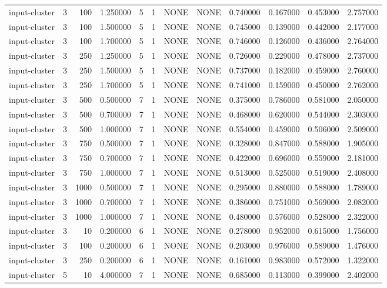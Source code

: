 \begin{tabular}{lrrrllllrrrr}
input-cluster & 3 & 100 & 1.250000 & 5 & 1 & NONE & NONE & 0.740000 & 0.167000 & 0.453000 & 2.757000 \\
input-cluster & 3 & 100 & 1.500000 & 5 & 1 & NONE & NONE & 0.745000 & 0.139000 & 0.442000 & 2.177000 \\
input-cluster & 3 & 100 & 1.700000 & 5 & 1 & NONE & NONE & 0.746000 & 0.126000 & 0.436000 & 2.764000 \\
input-cluster & 3 & 250 & 1.250000 & 5 & 1 & NONE & NONE & 0.726000 & 0.229000 & 0.478000 & 2.737000 \\
input-cluster & 3 & 250 & 1.500000 & 5 & 1 & NONE & NONE & 0.737000 & 0.182000 & 0.459000 & 2.760000 \\
input-cluster & 3 & 250 & 1.700000 & 5 & 1 & NONE & NONE & 0.741000 & 0.159000 & 0.450000 & 2.762000 \\
input-cluster & 3 & 500 & 0.500000 & 7 & 1 & NONE & NONE & 0.375000 & 0.786000 & 0.581000 & 2.050000 \\
input-cluster & 3 & 500 & 0.700000 & 7 & 1 & NONE & NONE & 0.468000 & 0.620000 & 0.544000 & 2.303000 \\
input-cluster & 3 & 500 & 1.000000 & 7 & 1 & NONE & NONE & 0.554000 & 0.459000 & 0.506000 & 2.509000 \\
input-cluster & 3 & 750 & 0.500000 & 7 & 1 & NONE & NONE & 0.328000 & 0.847000 & 0.588000 & 1.905000 \\
input-cluster & 3 & 750 & 0.700000 & 7 & 1 & NONE & NONE & 0.422000 & 0.696000 & 0.559000 & 2.181000 \\
input-cluster & 3 & 750 & 1.000000 & 7 & 1 & NONE & NONE & 0.513000 & 0.525000 & 0.519000 & 2.408000 \\
input-cluster & 3 & 1000 & 0.500000 & 7 & 1 & NONE & NONE & 0.295000 & 0.880000 & 0.588000 & 1.789000 \\
input-cluster & 3 & 1000 & 0.700000 & 7 & 1 & NONE & NONE & 0.386000 & 0.751000 & 0.569000 & 2.082000 \\
input-cluster & 3 & 1000 & 1.000000 & 7 & 1 & NONE & NONE & 0.480000 & 0.576000 & 0.528000 & 2.322000 \\
input-cluster & 3 & 10 & 0.200000 & 6 & 1 & NONE & NONE & 0.278000 & 0.952000 & 0.615000 & 1.756000 \\
input-cluster & 3 & 100 & 0.200000 & 6 & 1 & NONE & NONE & 0.203000 & 0.976000 & 0.589000 & 1.476000 \\
input-cluster & 3 & 250 & 0.200000 & 6 & 1 & NONE & NONE & 0.161000 & 0.983000 & 0.572000 & 1.322000 \\
input-cluster & 5 & 10 & 4.000000 & 7 & 1 & NONE & NONE & 0.685000 & 0.113000 & 0.399000 & 2.402000 \\

\end{tabular}
